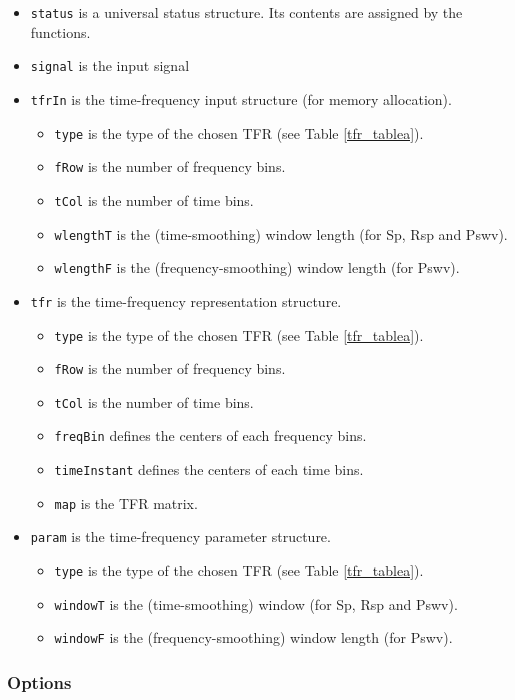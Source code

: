 \documentclass{article}
\begin{document}
\begin{itemize}
\item \texttt{status} is a universal status structure. Its contents are
assigned by the functions.
\item  \texttt{signal} is the input signal
\item \texttt{tfrIn} is the time-frequency input structure (for memory 
allocation).
\begin{itemize}
\item \texttt{type} is the type of the chosen TFR (see Table \ref{tfr_tablea}).
\item \texttt{fRow} is the number of frequency bins.
\item \texttt{tCol} is the number of time bins.
\item \texttt{wlengthT} is the (time-smoothing) window length (for Sp, 
Rsp and Pswv).
\item \texttt{wlengthF} is the (frequency-smoothing) window length (for Pswv).
\end{itemize}
\item \texttt{tfr} is the time-frequency representation structure.
\begin{itemize}
\item \texttt{type} is the type of the chosen TFR (see Table \ref{tfr_tablea}).
\item \texttt{fRow} is the number of frequency bins.
\item \texttt{tCol} is the number of time bins.
\item \texttt{freqBin} defines the centers of each frequency bins.
\item \texttt{timeInstant} defines the centers of each time bins.
\item \texttt{map} is the TFR matrix.
\end{itemize}
\item \texttt{param} is the time-frequency parameter structure.
\begin{itemize}
\item \texttt{type} is the type of the chosen TFR (see Table \ref{tfr_tablea}).
\item \texttt{windowT} is the (time-smoothing) window (for Sp, 
Rsp and Pswv).
\item \texttt{windowF} is the (frequency-smoothing) window length (for 
Pswv).
\end{itemize}
\end{itemize}

\subsubsection{Options}
\end{document}
